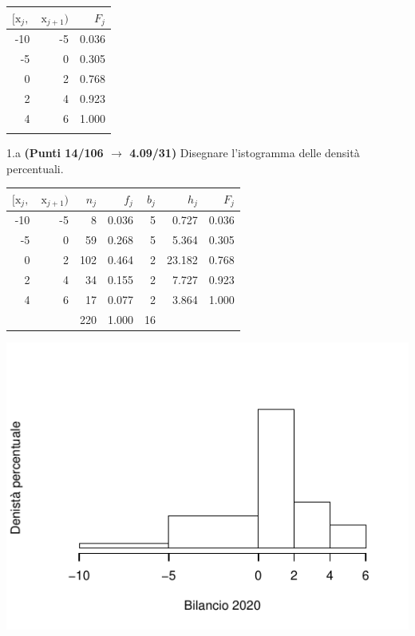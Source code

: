 \documentclass[
  11pt,
]{book}
\theoremstyle{mytheoremstyle}
\theoremstyle{mydefstyle}
\newenvironment{sol}
  {
  \begin{tcolorbox}[enhanced,breakable,arc=0.1mm,boxrule=1pt,colback=white,colframe=iblue,
  title=\bf \fontfamily{lmss}\selectfont \hspace{.5 cm} Soluzione,drop fuzzy shadow]

}{
\end{tcolorbox}
  }
\begin{document}
\begin{table}[H]
\centering
\begin{tabular}{rrr}
\toprule
$[\text{x}_j,$ & $\text{x}_{j+1})$ & $F_j$\\
\midrule
-10 & -5 & 0.036\\
-5 & 0 & 0.305\\
0 & 2 & 0.768\\
2 & 4 & 0.923\\
4 & 6 & 1.000\\
 &  & \\
\bottomrule
\end{tabular}
\end{table}

1.a \textbf{(Punti 14/106 \(\rightarrow\) 4.09/31)} Disegnare l'istogramma delle densità percentuali.

\begin{sol}

\begin{table}[H]
\centering
\begin{tabular}{rrrrrrr}
\toprule
$[\text{x}_j,$ & $\text{x}_{j+1})$ & $n_j$ & $f_j$ & $b_j$ & $h_j$ & $F_j$\\
\midrule
-10 & -5 & 8 & 0.036 & 5 & 0.727 & 0.036\\
-5 & 0 & 59 & 0.268 & 5 & 5.364 & 0.305\\
0 & 2 & 102 & 0.464 & 2 & 23.182 & 0.768\\
2 & 4 & 34 & 0.155 & 2 & 7.727 & 0.923\\
4 & 6 & 17 & 0.077 & 2 & 3.864 & 1.000\\
 &  & 220 & 1.000 & 16 &  & \\
\bottomrule
\end{tabular}
\end{table}

\begin{center}\includegraphics{Esami_passati_con_soluzioni_files/figure-latex/2022-95-1} \end{center}

\end{sol}
\end{document}
